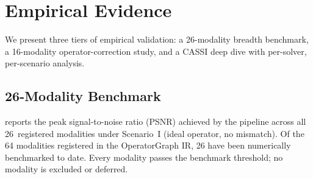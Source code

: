 
\section{Empirical Evidence}
\label{sec:evidence}

We present three tiers of empirical validation: a 26-modality breadth
benchmark, a 16-modality operator-correction study, and a CASSI deep
dive with per-solver, per-scenario analysis.

\subsection{26-Modality Benchmark}
\label{subsec:benchmark}

 reports the peak signal-to-noise ratio (PSNR) achieved
by the \pwm{} pipeline across all 26~registered modalities under
Scenario~I (ideal operator, no mismatch).  Of the 64 modalities registered in the OperatorGraph IR, 26 have been numerically benchmarked to date.  Every modality passes the
benchmark threshold; no modality is excluded or deferred.

